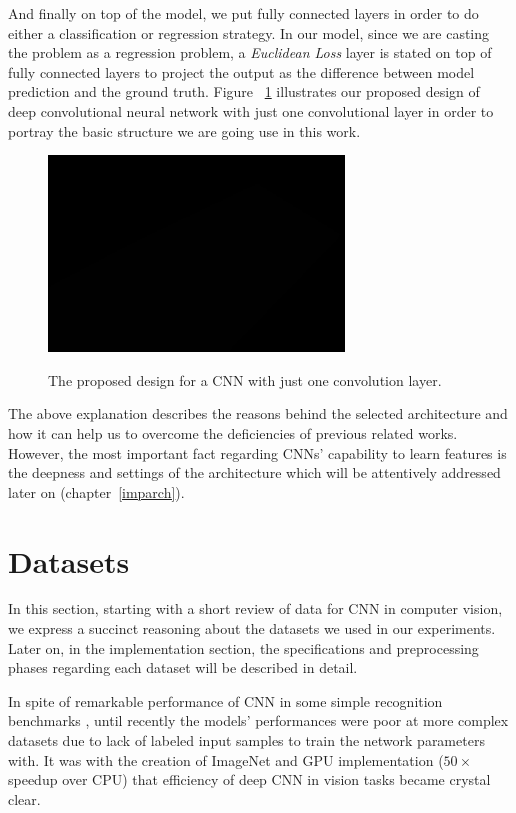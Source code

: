 And finally on top of the model, we put fully connected layers in order to do either a classification or regression strategy. In our model, since we are casting the problem as a regression problem, a \textit{Euclidean Loss} layer is stated on top of fully connected layers to project the output as the difference between model prediction and the ground truth. Figure ~\ref{fig:proposenet} illustrates our proposed design of deep convolutional neural network with just one convolutional layer in order to portray the basic structure we are going use in this work. 

\begin{figure}[H]
	\centering
	{\includegraphics[width=0.7\textwidth]{images/1}}
	\caption{The proposed design for a CNN with just one convolution layer.}
	\label{fig:proposenet}
\end{figure}

The above explanation describes the reasons behind the selected architecture and how it can help us to overcome the deficiencies of previous related works. However, the most important fact regarding CNNs' capability to learn features is the deepness and settings of the architecture which will be attentively addressed later on (chapter~\ref{imparch}).  

\section{Datasets} 

In this section, starting with a short review of data for CNN in computer vision, we express a succinct reasoning about the datasets we used in our experiments. Later on, in the implementation section, the specifications and preprocessing phases regarding each dataset will be described in detail. 

In spite of remarkable  performance of CNN in some simple recognition benchmarks \cite{cirecsan2011convolutional, ciresan2015multi, wan2013regularization, cirecsan2012multi}, until recently the models' performances were poor at more complex datasets  \cite{griffin2007caltech} due to lack of labeled input samples to train the network parameters with. It was with the creation of ImageNet \cite{deng2009imagenet} and GPU implementation \cite{krizhevsky2012imagenet} ($50\times$ speedup over CPU) that efficiency of deep CNN in vision tasks became crystal clear.

